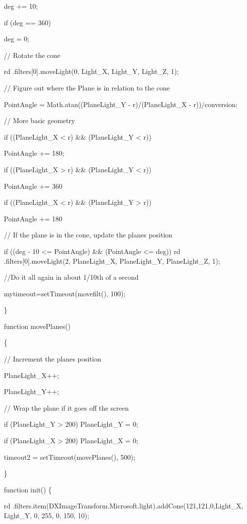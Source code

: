 \documentclass[
]{article}
\begin{document}
deg += 10;

if (deg == 360)

deg = 0;

// Rotate the cone

rd .filters{[}0{]}.moveLight(0, Light\_X, Light\_Y, Light\_Z, 1);

// Figure out where the Plane is in relation to the cone

PointAngle = Math.atan((PlaneLight\_Y - r)/(PlaneLight\_X -
r))/conversion;

// More basic geometry

if ((PlaneLight\_X \textless{} r) \&\& (PlaneLight\_Y \textless{} r))

PointAngle += 180;

if ((PlaneLight\_X \textgreater{} r) \&\& (PlaneLight\_Y \textless{} r))

PointAngle += 360

if ((PlaneLight\_X \textless{} r) \&\& (PlaneLight\_Y \textgreater{} r))

PointAngle += 180

// If the plane is in the cone, update the planes position

if ((deg - 10 \textless= PointAngle) \&\& (PointAngle \textless= deg))
rd .filters{[}0{]}.moveLight(2, PlaneLight\_X, PlaneLight\_Y,
PlaneLight\_Z, 1);

//Do it all again in about 1/10th of a second

mytimeout=setTimeout(\textquotesingle movefilt()\textquotesingle, 100);

\}

function movePlanes()

\{

// Increment the planes position

PlaneLight\_X++;

PlaneLight\_Y++;

// Wrap the plane if it goes off the screen

if (PlaneLight\_Y \textgreater{} 200) PlaneLight\_Y = 0;

if (PlaneLight\_X \textgreater{} 200) PlaneLight\_X = 0;

timeout2 = setTimeout(\textquotesingle movePlanes()\textquotesingle,
500);

\}

function init() \{

rd
.filters.item(\textquotesingle DXImageTransform.Microsoft.light\textquotesingle).addCone(121,121,0,Light\_X,
Light\_Y, 0, 255, 0, 150, 10);
\end{document}
